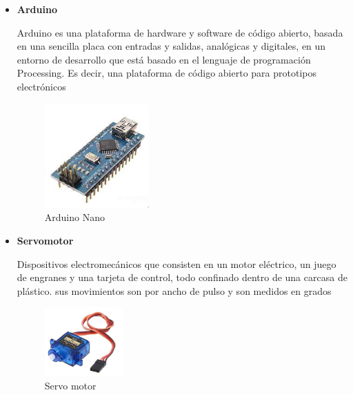 \documentclass[letterpaper,12pt]{article}
\begin{document}
{\begin{itemize}
\begin{figure}[h]
			\end{figure}
			
			
			\item \textbf{Arduino}
			
			Arduino es una plataforma de hardware y software de código abierto, basada en una sencilla placa con entradas y salidas, analógicas y digitales, en un entorno de desarrollo que está basado en el lenguaje de programación Processing. Es decir, una plataforma de código abierto para prototipos electrónicos
			
			\begin{figure}[h]
				\centering
				\begin{minipage}[t]{5cm}
					\includegraphics[width=4cm]{images/arduino.jpeg}	 %
					\caption{ Arduino Nano}
				\end{minipage}
				
			\end{figure}
			
			
			
			
			\item \textbf{Servomotor}
			
			Dispositivos electromecánicos que consisten en un motor eléctrico, un juego de engranes y una tarjeta de control, todo confinado dentro de una carcasa de plástico. sus movimientos son por ancho de pulso y son medidos en grados
			
			\begin{figure}[h]
				\centering
				\begin{minipage}[t]{5cm}
					\includegraphics[width=3cm]{images/servo.jpg}	 %
					\caption{ Servo motor}
				\end{minipage}
				
			\end{figure}
			

\end{itemize}}
\end{document}
